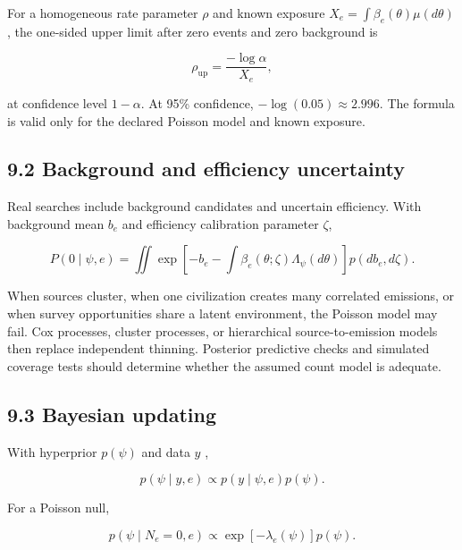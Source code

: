 \documentclass[11pt,a4paper]{article}
\begin{document}
For a homogeneous rate parameter \(\rho\) and known exposure \(X_e=\int\beta_e(\theta)\mu(d\theta)\), the one-sided upper limit after zero events and zero background is

\begin{equation}
\rho_{\mathrm{up}}=\frac{-\log\alpha}{X_e},
\end{equation}

at confidence level \(1-\alpha\). At 95\% confidence, \(-\log(0.05)\approx2.996\). The formula is valid only for the declared Poisson model and known exposure.

\subsection{9.2 Background and efficiency uncertainty}\label{92-background-and-efficiency-uncertainty}

Real searches include background candidates and uncertain efficiency. With background mean \(b_e\) and efficiency calibration parameter \(\zeta\),

\begin{equation}
P(0\mid\psi,e)=
\iint\exp\!\left[-b_e-
\int\beta_e(\theta;\zeta)\Lambda_\psi(d\theta)
\right]p(db_e,d\zeta).
\end{equation}

When sources cluster, when one civilization creates many correlated emissions, or when survey opportunities share a latent environment, the Poisson model may fail. Cox processes, cluster processes, or hierarchical source-to-emission models then replace independent thinning. Posterior predictive checks and simulated coverage tests should determine whether the assumed count model is adequate.

\subsection{9.3 Bayesian updating}\label{93-bayesian-updating}

With hyperprior \(p(\psi)\) and data \(y\) \citep{stuart2010},

\begin{equation}
p(\psi\mid y,e)\propto p(y\mid\psi,e)p(\psi).
\end{equation}

For a Poisson null,

\begin{equation}
p(\psi\mid N_e=0,e)
\propto\exp[-\lambda_e(\psi)]p(\psi).
\end{equation}
\end{document}

